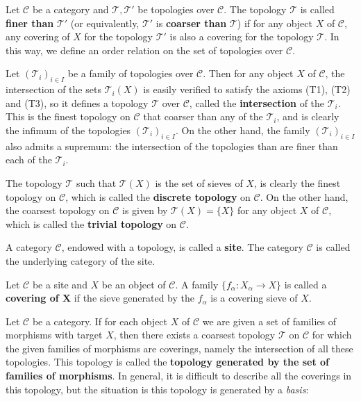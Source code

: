 Let $\mathcal{C}$ be a category and $\mathcal{T},\mathcal{T}'$ be topologies over $\mathcal{C}$. The topology $\mathcal{T}$ is called \textbf{finer than} $\mathcal{T}'$ (or equivalently, $\mathcal{T}'$ is \textbf{coarser than} $\mathcal{T}$) if for any object $X$ of $\mathcal{C}$, any covering of $X$ for the topology $\mathcal{T}'$ is also a covering for the topology $\mathcal{T}$. In this way, we define an order relation on the set of topologies over $\mathcal{C}$.
\begin{example}\label{G-topo intersection and union}
Let $(\mathcal{T}_i)_{i\in I}$ be a family of topologies over $\mathcal{C}$. Then for any object $X$ of $\mathcal{C}$, the intersection of the sets $\mathcal{T}_i(X)$ is easily verified to satisfy the axioms (T1), (T2) and (T3), so it defines a topology $\mathcal{T}$ over $\mathcal{C}$, called the \textbf{intersection} of the $\mathcal{T}_i$. This is the finest topology on $\mathcal{C}$ that coarser than any of the $\mathcal{T}_i$, and is clearly the infimum of the topologies $(\mathcal{T}_i)_{i\in I}$. On the other hand, the family $(\mathcal{T}_i)_{i\in I}$ also admits a supremum: the intersection of the topologies than are finer than each of the $\mathcal{T}_i$.
\end{example}
\begin{example}\label{G-topo discrete}
The topology $\mathcal{T}$ such that $\mathcal{T}(X)$ is the set of sieves of $X$, is clearly the finest topology on $\mathcal{C}$, which is called the \textbf{discrete topology} on $\mathcal{C}$. On the other hand, the coarsest topology on $\mathcal{C}$ is given by $\mathcal{T}(X)=\{X\}$ for any object $X$ of $\mathcal{C}$, which is called the \textbf{trivial topology} on $\mathcal{C}$.
\end{example}
A category $\mathcal{C}$, endowed with a topology, is called a \textbf{site}. The category $\mathcal{C}$ is called the underlying category of the site.
\begin{definition}
Let $\mathcal{C}$ be a site and $X$ be an object of $\mathcal{C}$. A family $\{f_\alpha:X_\alpha\to X\}$ is called a \textbf{covering of $\bm{X}$} if the sieve generated by the $f_\alpha$ is a covering sieve of $X$.
\end{definition}
Let $\mathcal{C}$ be a category. If for each object $X$ of $\mathcal{C}$ we are given a set of families of morphisms with target $X$, then there exists a coarsest topology $\mathcal{T}$ on $\mathcal{C}$ for which the given families of morphisms are coverings, namely the intersection of all these topologies. This topology is called the \textbf{topology generated by the set of families of morphisms}. In general, it is difficult to describe all the coverings in this topology, but the situation is this topology is generated by a \textit{basis}:
